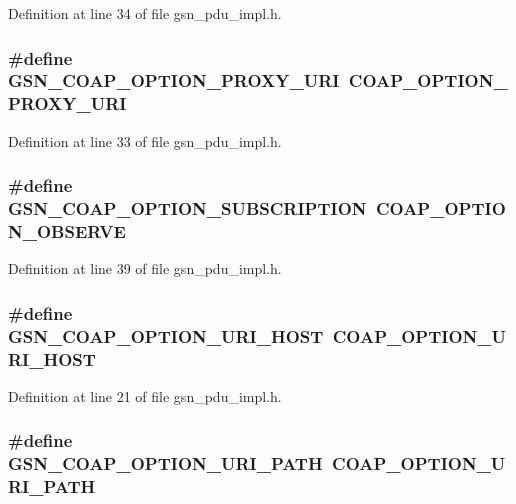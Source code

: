 Definition at line 34 of file gsn\_\-pdu\_\-impl.h.

\hypertarget{a00538_a6f3680e3a5fe2fb576732cfe97ce94bf}{
\subsubsection[{GSN\_\-COAP\_\-OPTION\_\-PROXY\_\-URI}]{\setlength{\rightskip}{0pt plus 5cm}\#define GSN\_\-COAP\_\-OPTION\_\-PROXY\_\-URI~COAP\_\-OPTION\_\-PROXY\_\-URI}}
\label{a00538_a6f3680e3a5fe2fb576732cfe97ce94bf}


Definition at line 33 of file gsn\_\-pdu\_\-impl.h.

\hypertarget{a00538_a1806fdf67281ec7ce5653f42a6d74e4f}{
\subsubsection[{GSN\_\-COAP\_\-OPTION\_\-SUBSCRIPTION}]{\setlength{\rightskip}{0pt plus 5cm}\#define GSN\_\-COAP\_\-OPTION\_\-SUBSCRIPTION~COAP\_\-OPTION\_\-OBSERVE}}
\label{a00538_a1806fdf67281ec7ce5653f42a6d74e4f}


Definition at line 39 of file gsn\_\-pdu\_\-impl.h.

\hypertarget{a00538_aa1cf57f0a34deaa2bfef8a093d08691d}{
\subsubsection[{GSN\_\-COAP\_\-OPTION\_\-URI\_\-HOST}]{\setlength{\rightskip}{0pt plus 5cm}\#define GSN\_\-COAP\_\-OPTION\_\-URI\_\-HOST~COAP\_\-OPTION\_\-URI\_\-HOST}}
\label{a00538_aa1cf57f0a34deaa2bfef8a093d08691d}


Definition at line 21 of file gsn\_\-pdu\_\-impl.h.

\hypertarget{a00538_aa500b59b9d4fcbe031289432e4ca4dde}{
\subsubsection[{GSN\_\-COAP\_\-OPTION\_\-URI\_\-PATH}]{\setlength{\rightskip}{0pt plus 5cm}\#define GSN\_\-COAP\_\-OPTION\_\-URI\_\-PATH~COAP\_\-OPTION\_\-URI\_\-PATH}}
\label{a00538_aa500b59b9d4fcbe031289432e4ca4dde}


